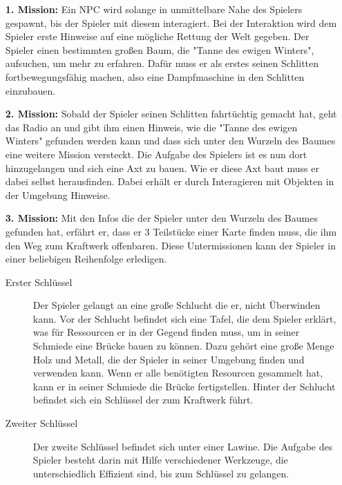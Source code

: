 \documentclass[a4paper,
  twoside, %
  headlines=2.1 %
  ]{scrartcl}
\begin{document}
	\begin{itemize}
		\item[\textbf{1. Mission:}] 
			Ein NPC wird solange in unmittelbare Nahe des Spielers gespawnt, bis der Spieler mit diesem interagiert. 
			Bei der Interaktion wird dem Spieler erste Hinweise auf eine mögliche Rettung der Welt gegeben. Der Spieler einen bestimmten großen Baum, die "Tanne des ewigen Winters", aufsuchen,
			um mehr zu erfahren.
			Dafür muss er als erstes seinen Schlitten fortbewegungsfähig machen, also eine Dampfmaschine in den Schlitten einzubauen.\\
		\item[\textbf{2. Mission:}] 
			Sobald der Spieler seinen Schlitten fahrtüchtig gemacht hat, geht das Radio
			an und gibt ihm einen Hinweis, wie die "Tanne des ewigen Winters" gefunden
			werden kann und dass sich unter den Wurzeln des Baumes eine weitere Mission
			versteckt. Die Aufgabe des Spielers ist es nun dort hinzugelangen und sich
			eine Axt zu bauen. Wie er diese Axt baut muss er dabei selbst herausfinden.
			Dabei erhält er durch Interagieren mit Objekten in der Umgebung Hinweise. \\
		\item[\textbf{3. Mission:}] 
			Mit den Infos die der Spieler unter den Wurzeln des Baumes gefunden hat,
			erfährt er, dass er 3 Teilstücke einer Karte finden muss, die ihm den Weg
			zum Kraftwerk offenbaren. Diese Untermissionen kann der Spieler in einer
			beliebigen Reihenfolge erledigen. \\
				\begin{description}
					\item[Erster Schlüssel]
				        Der Spieler gelangt an eine große Schlucht die er, nicht Überwinden kann. Vor der Schlucht befindet sich eine Tafel, die dem Spieler erklärt, was für Ressourcen er in der Gegend finden muss, um in seiner Schmiede eine Brücke bauen zu können. Dazu gehört eine große Menge Holz und Metall, die der Spieler in seiner Umgebung finden und verwenden kann. Wenn er alle benötigten Resourcen gesammelt hat, kann er in seiner Schmiede die Brücke fertigstellen. Hinter der Schlucht befindet sich ein Schlüssel der zum Kraftwerk führt.\\
					\item[Zweiter Schlüssel]
						Der zweite Schlüssel befindet sich unter einer Lawine. Die Aufgabe des Spieler besteht darin mit Hilfe verschiedener Werkzeuge, die unterschiedlich Effizient sind, bis zum Schlüssel zu gelangen.\\

\end{description}
\end{itemize}
\end{document}
